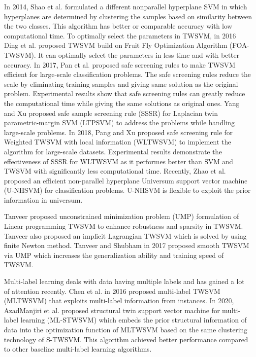 \documentclass[pdflatex,sn-mathphys]{sn-jnl}%
\theoremstyle{thmstyleone}%
\theoremstyle{thmstyletwo}%
\theoremstyle{thmstylethree}%
\begin{document}
In 2014, Shao et al. \cite{shao2014nonparallel} formulated a different nonparallel hyperplane SVM in which hyperplanes are determined by clustering the samples based on similarity between the two classes. This algorithm has better or comparable accuracy with low computational time. To optimally select the parameters in TWSVM, in 2016 Ding et al. \cite{ding2016twin} proposed TWSVM build on Fruit Fly Optimization Algorithm (FOA-TWSVM). It can optimally select the parameters in less time and with better accuracy. In 2017, Pan et al. \cite{pan2017safe} proposed safe screening rules to make TWSVM efficient for large-scale classification problems. 
The safe screening rules reduce the scale by eliminating training samples and giving same solution as the original problem. Experimental results show that safe screening rules can greatly reduce the computational time while giving the same solutions as original ones. Yang and Xu \cite{yang2018safe} proposed safe sample screening rule (SSSR) for Laplacian twin parametric-margin SVM (LTPSVM) to address the problems while handling large-scale problems. In 2018, Pang and Xu \cite{pang2019safe} proposed safe screening rule for Weighted TWSVM with local information (WLTWSVM) to implement the algorithm for large-scale datasets. Experimental results demonstrate the effectiveness of SSSR for WLTWSVM as it performes better than SVM and TWSVM with significantly less computational time. Recently, Zhao et al. \cite{zhao2019improved} proposed an efficient non-parallel hyperplane Universum support vector machine (U-NHSVM) for classification problems. U-NHSVM is flexible to exploit the prior information in universum. 


Tanveer \cite{tanveer2015application} proposed unconstrained minimization problem (UMP) formulation of Linear programming TWSVM to enhance robustness and sparsity in TWSVM. Tanveer \cite{tanveer2015newton} also proposed an implicit Lagrangian TWSVM which is solved by using finite Newton method. Tanveer and Shubham \cite{tanveer2017smooth} in 2017 proposed smooth TWSVM via UMP which increases the generalization ability and training speed of TWSVM.

Multi-label learning deals with data having multiple labels and has gained a lot of attention recently. Chen et al. \cite{chen2016mltsvm} in 2016 proposed multi-label TWSVM (MLTWSVM) that exploits multi-label information from instances. In 2020, Azad\textendash Manjiri et al. 
 \cite{azad2020ml} proposed structural twin support
vector machine for multi-label learning (ML-STWSVM) which embeds the prior structural information of data into the optimization function of MLTWSVM based
on the same clustering technology of S-TWSVM. This algorithm achieved better performance compared to other baseline multi-label learning algorithms. 
\end{document}
